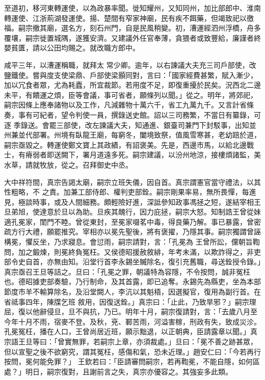 \begin{pinyinscope}
 至道初，移河東轉運使，以為政暴率聞。徙知耀州，又知同州，加比部郎中、淮南轉運使、江浙荊湖發運使。揚、楚間有窄家神廟，民有疾不餌藥，但竭致祀以徼福。嗣宗撤其廟，選名方，刻石州門，自是民風稍變。初，漕運經泗州浮橋，舟多覆壤，嗣宗徙置城隅，遂獲安濟。又建議外任官奉薄，貪猥者或致豐給，廉謹者終嬰貧匱，請以公田均賜之。就改職方郎中。



 咸平三年，以漕運稱職，就拜太
 常少卿。逾年，以右諫議大夫充三司戶部使，改鹽鐵使。嘗與度支使梁鼎、戶部使梁顥同對，言曰：「國家經費甚繁，賦入漸少，加以冗食者眾，尤為耗蠹，所宜裁節。若用度不足，即復重擾於民矣。況西北二邊未平，有饋運之煩，臣等會議，事可省者，願條列以聞。」從之。明年，將郊祀，嗣宗因條上應奉諸物以及工作，凡減雜物十萬六千，省工九萬九千。又言計省條奏，事有可紀者，望令判使一員，撰錄送史館。詔以三司務繁，不當日有纂錄，可逐
 季錄送。會罷三部使，改左諫議大夫，知通進、銀臺司兼門下封駁事，出知並州兼並代部署。州境有臥龍王廟，每窮冬，闔境致祭，值風雪寒甚，老幼踣於道，嗣宗亟毀之。轉運使鄭文寶上其政績，有詔褒美。先是，西邊市馬，以給北邊戰士，有瘠弱者即送闕下，署月道遠多死。嗣宗建議，以汾州地涼，接樓煩諸監，美水草，請就牧放，從之。召拜御史中丞。



 大中祥符間，真宗告謁太廟，嗣宗立班失儀，因自首。真宗謂憲官當守禮法，以其性粗略，不
 之責。加兼工部侍郎、權判吏部銓。嗣宗剛果率易，無所畏憚，每進見，極談時事，或及人間細務。頗輕險好進，深詆參知政事馮拯之短，遂結宰相王旦弟旭，使達意於旦以為助。旦疾其醜行，因力庇拯，嗣宗大怒。知制誥王曾從妹適孔冕家，閨門不睦。曾從東封，至冕家啜茗中毒，得良藥乃解。事已暴露，曾密疏方行大禮，願罷推究。宰相亦以冕先聖後，將有褒擢，乃隱其事。嗣宗獨謂曾誣構冕，懼反坐，乃求寢息。會愆雨，嗣宗請對，言：「孔冕為
 王曾所訟，儻朝旨鞫問，加之鍛煉，則冕終負冤枉。又侯德昭援赦敘緋，年考未滿，以欺詐得之，非吏部令史自首，亦無由知。沿堂行首李永錫坐贓除名，復引充舊職，尋送銓授令錄。」真宗亟召王旦等詰之。旦曰：「孔冕之罪，朝議特為容隱，不令按問，誠非冤枉也。德昭據吏部奏驗，乃行制命，及其首露，即已追奪。永錫先為縣吏，坐為本部節度市羊不輸算除名，及沿堂闕人，李沆以其魁梧，因選擬官，復用為副行首。在省祗事四年，陳牒乞班
 敘用，因復送銓。」真宗曰：「止此，乃致旱邪？」嗣宗理屈，復以他辭侵旦，旦不與抗，乃已。明年十月，嗣宗復請對，言：「去歲八月至今年十月不雨，宿麥不登。及秋，兗、鄆苦雨，河溢害稼，刑政有失，致成災沴。孔冕冤枉，播在人口，王曾尚居近班，願示黜退，以正朝典，臣請露章以聞。」真宗語王旦等曰：「曾實無罪，若嗣宗上章，亦須裁處。」旦曰：「冕不善之跡甚眾，但以宣聖之後不欲窮究，謂其冤枉，感傷和氣，恐未近理。」趙安仁曰：「今若再行按問，冕何能免罪？」
 王欽若曰：「臣請審問嗣宗，若再鞫冕，不能自隱，如何區處？」明日，嗣宗復對，且謝前言之失，真宗亦優容之。其強妄多此類。




\end{pinyinscope}

